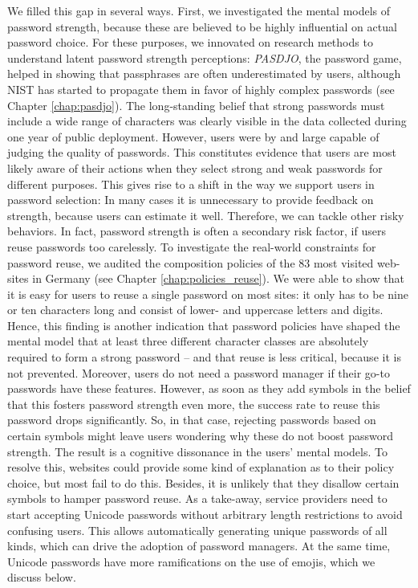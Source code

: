 We filled this gap in several ways. First, we investigated the mental models of password strength, because these are believed to be highly influential on actual password choice. For these purposes, we innovated on research methods to understand latent password strength perceptions: \textit{PASDJO}, the password game, helped in showing that passphrases are often underestimated by users, although \gls{NIST} has started to propagate them in favor of highly complex passwords (see Chapter \ref{chap:pasdjo}). The long-standing belief that strong passwords must include a wide range of characters was clearly visible in the data collected during one year of public deployment. However, users were by and large capable of judging the quality of passwords. This constitutes evidence that users are most likely aware of their actions when they  select strong and weak passwords for different purposes. This gives rise to a shift in the way we support users in password selection: In many cases it is unnecessary to provide feedback on strength, because users can estimate it well. Therefore, we can tackle other risky behaviors. 
In fact, password strength is often a secondary risk factor, if users reuse passwords too carelessly. To investigate the real-world constraints for password reuse, we audited the composition policies of the 83 most visited web-sites in Germany (see Chapter \ref{chap:policies_reuse}). We were able to show that it is easy for users to reuse a single password on most sites: it only has to be nine or ten characters long and consist of lower- and uppercase letters and digits. Hence, this finding is another indication that password policies have shaped the mental model that at least three different character classes are absolutely required to form a strong password -- and that reuse is less critical, because it is not prevented. Moreover, users do not need a password manager if their go-to passwords have these features. However, as soon as they add symbols in the belief that this fosters password strength even more, the success rate to reuse this password drops significantly. So, in that case, rejecting passwords based on certain symbols might leave users wondering why these do not boost password strength. The result is a cognitive dissonance in the users' mental models. To resolve this, websites could provide some kind of explanation as to their policy choice, but most fail to do this. Besides, it is unlikely that they disallow certain symbols to hamper password reuse. As a take-away, service providers need to start accepting Unicode passwords without arbitrary length restrictions to avoid confusing users. This allows automatically generating unique passwords of all kinds, which can drive the adoption of password managers. At the same time, Unicode passwords have more ramifications on the use of emojis, which we discuss below. 

